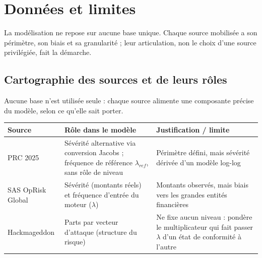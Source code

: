 \chapter{Données et limites}
\label{chap:donnees}


La modélisation ne repose sur aucune base unique. Chaque source mobilisée a son périmètre,
son biais et sa granularité ; leur articulation, non le choix d'une source
privilégiée, fait la démarche.

\section{Cartographie des sources et de leurs rôles}
\label{sec:carto}

Aucune base n'est utilisée seule : chaque source alimente une composante précise du modèle,
selon ce qu'elle sait porter.

\begin{center}
\renewcommand{\arraystretch}{1.3}
\begin{tabular}{>{\raggedright}p{3cm} >{\raggedright}p{5.5cm} >{\raggedright\arraybackslash}p{5.5cm}}
\toprule
\rowcolor{lightblue}
\textbf{Source} & \textbf{Rôle dans le modèle} & \textbf{Justification / limite} \\
\midrule
PRC 2025 & Sévérité alternative via conversion Jacobs ; fréquence de référence $\lambda_{ref}$, sans rôle de niveau &
Périmètre défini, mais sévérité dérivée d'un modèle log-log \\
\addlinespace
SAS OpRisk Global & Sévérité (montants réels) et fréquence d'entrée du moteur ($\lambda$) &
Montants observés, mais biais vers les grandes entités financières \\
\addlinespace
Hackmageddon & Parts par vecteur d'attaque (structure du risque) &
Ne fixe aucun niveau : pondère le multiplicateur qui fait passer $\lambda$ d'un état de conformité à l'autre \\
\bottomrule
\end{tabular}
\end{center}

